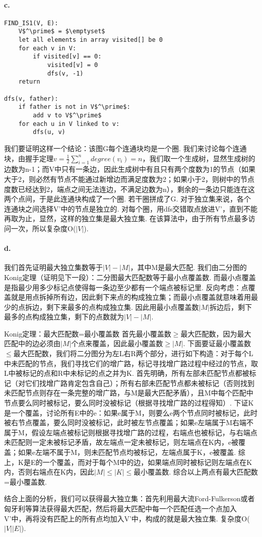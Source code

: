 \documentclass[UTF8]{ctexart}
\begin{document}
\paragraph*{c.}
\begin{lstlisting}[mathescape=true]
FIND_IS1(V, E):
    V$^\prime$ = $\emptyset$
    let all elements in array visited[] be 0
    for each v in V:
        if visited[v] == 0:
            visited[v] = 0
            dfs(v, -1)
    return
    
dfs(v, father):
    if father is not in V$^\prime$:
        add v to V$^\prime$
    for each u in V linked to v:
        dfs(u, v)
\end{lstlisting}\par


我们要证明这样一个结论：该图G每个连通块均是一个圈. 我们来讨论每个连通块，由握手定理$v=\frac{1}{2}\sum_{i=1}^{n}degree(v_i)=n$，我们取一个生成树，显然生成树的边数为n-1；而V中只有一条边，因此生成树中有且只有两个度数为1的节点（如果大于2，则必然有节点不能通过新增边而满足度数为2；如果小于2，则树中的节点度数已经达到2，端点之间无法连边，不满足边数为n），剩余的一条边只能连在这两个点间，于是此连通块构成了一个圈. 若干圈拼成了G. 对于独立集来说，各个连通块之间选择V'中的节点是独立的. 对每个圈，用dfs交错取点放进V'，直到不能再取为止，显然，这样的独立集是最大独立集. 在该算法中，由于所有节点最多访问一次，所以复杂度O($|V|$).

\paragraph*{d.}
我们首先证明最大独立集数等于$|V|-|M|$，其中M是最大匹配. 我们由二分图的Konig定理（证明见下一段）：二分图最大匹配数等于最小点覆盖数. 而最小点覆盖是指最少用多少标记点使得每一条边至少都有一个端点被标记里. 反向考虑：点覆盖就是用点拆掉所有边，因此剩下来点的构成独立集；而最小点覆盖就意味着用最少的点拆边，剩下来最多的点构成独立集. 因此用最小点覆盖数$|M|$拆边后，剩下最多的点构成独立集，剩下的点数就为$|V|-|M|$.\par
Konig定理：最大匹配数=最小覆盖数 首先最小覆盖数$\ge$最大匹配数，因为最大匹配中的边必须由$|M|$个点来覆盖，因此最小覆盖数$\ge |M|$. 下面要证最小覆盖数$\le$最大匹配数，我们将二分图分为左L右R两个部分，进行如下构造：对于每个L中未匹配的节点，我们寻找它们的增广路，标记寻找增广路过程中经过的节点，取L中被标记的点和R中未标记的点之并为K. 首先明确，所有左部未匹配节点都被标记（对它们找增广路肯定包含自己）；所有右部未匹配节点都未被标记（否则找到未匹配节点则存在一条完整的增广路，与M是最大匹配矛盾），且M中每个匹配中节点要么同时被标记，要么同时没被标记（根据寻找增广路的过程得知）. 下证K是一个覆盖，讨论所有E中的e：如果e属于M，则要么e两个节点同时被标记，此时被右节点覆盖，要么同时没被标记，此时被左节点覆盖；如果e左端属于M右端不属于M，假设左端点被标记则根据寻找增广路的过程，右端点也被标记，与右端点未匹配则一定未被标记矛盾，故左端点一定未被标记，则左端点在K内，e被覆盖；如果e左端不属于M，则未匹配节点均被标记，左端点属于K，e被覆盖. 综上，K是E的一个覆盖，而对于每个M中的边，如果端点同时被标记则左端点在K内，否则右端点在K内，因此$|M|\le |K| \le$最小覆盖数. 综合以上两点有最大匹配数=最小覆盖数.\par
结合上面的分析，我们可以获得最大独立集：首先利用最大流Ford-Fulkerson或者匈牙利等算法获得最大匹配，然后将最大匹配中每一个匹配任选一个点加入V'中，再将没有匹配上的所有点均加入V'中，构成的就是最大独立集. 复杂度O($|V||E|$).
\end{document}
